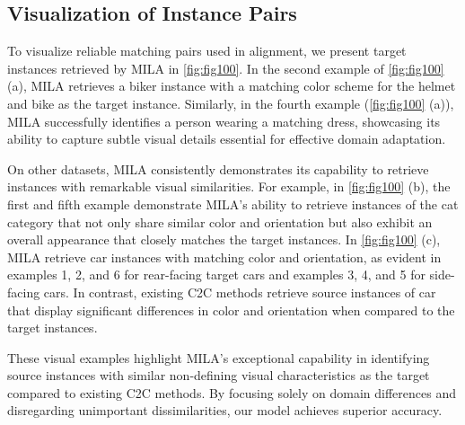 \documentclass{bmvc2k}
\begin{document}
\subsection{Visualization of Instance Pairs}\label{sec:qualitative}
To visualize reliable matching pairs used in alignment, we present target instances retrieved by MILA in \cref{fig:fig100}.
In the second example of \cref{fig:fig100} (a), MILA retrieves a biker instance with a matching color scheme for the helmet and bike as the target instance. Similarly, in the fourth example (\cref{fig:fig100} (a)), MILA successfully identifies a person wearing a matching dress, showcasing its ability to capture subtle visual details essential for effective domain adaptation. 

On other datasets, MILA consistently demonstrates its capability to retrieve instances with remarkable visual similarities. For example, in \cref{fig:fig100} (b), the first and fifth example demonstrate MILA's ability to retrieve instances of the cat category that not only share similar color and orientation but also exhibit an overall appearance that closely matches the target instances.
In \cref{fig:fig100} (c), MILA retrieve car instances with matching color and orientation, as evident in examples 1, 2, and 6 for rear-facing target cars and examples 3, 4, and 5 for side-facing cars. In contrast, existing C2C methods retrieve source instances of car that display significant differences in color and orientation when compared to the target instances.


These visual examples highlight MILA's exceptional capability in identifying source instances with similar non-defining visual characteristics as the target compared to existing C2C methods. By focusing solely on domain differences and disregarding unimportant dissimilarities, our model achieves superior accuracy.
\end{document}
